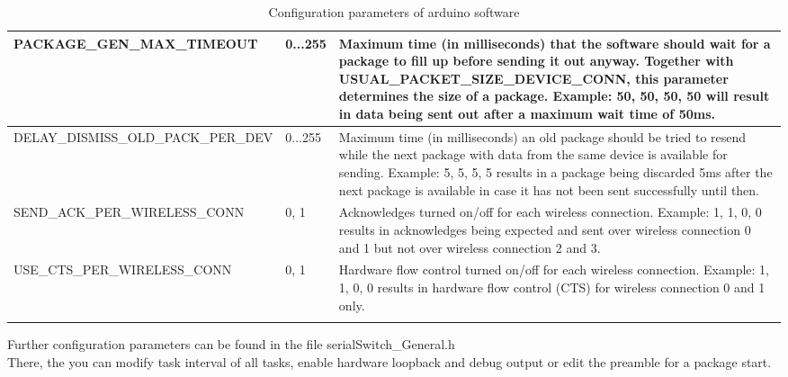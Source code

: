 \begin{center}
\begin{longtable}{p{4cm}p{2cm}p{8cm}}
            PACKAGE\_GEN\_MAX\_TIMEOUT  &  0...255 & 
            Maximum time (in milliseconds) that the software should wait for a package to fill up before sending it out anyway. Together with USUAL\_PACKET\_SIZE\_DEVICE\_CONN, this parameter determines the size of a package. Example: {50, 50, 50, 50} will result in data being sent out after a maximum wait time of 50ms.\\
            \hline
            DELAY\_DISMISS\_OLD\_PACK\_PER\_DEV &  0...255 & 
            Maximum time (in milliseconds) an old package should be tried to resend while the next package with data from the same device is available for sending. Example: {5, 5, 5, 5} results in a package being discarded 5ms after the next package is available in case it has not been sent successfully until then.\\
            \hline
            SEND\_ACK\_PER\_WIRELESS\_CONN &  0, 1 & 
            Acknowledges turned on/off for each wireless connection. Example: {1, 1, 0, 0} results in acknowledges being expected and sent over wireless connection 0 and 1 but not over wireless connection 2 and 3.\\
            \hline
            USE\_CTS\_PER\_WIRELESS\_CONN &  0, 1 & 
            Hardware flow control turned on/off for each wireless connection. Example: {1, 1, 0, 0} results in hardware flow control (CTS) for wireless connection 0 and 1 only.\\
            \hline
    \caption{Configuration parameters of arduino software}
    \label{Config arduino SW}    
    \end{longtable}
\end{center}
%
Further configuration parameters can be found in the file serialSwitch\_General.h\\
There, the you can modify task interval of all tasks, enable hardware loopback and debug output or edit the preamble for a package start.
%
